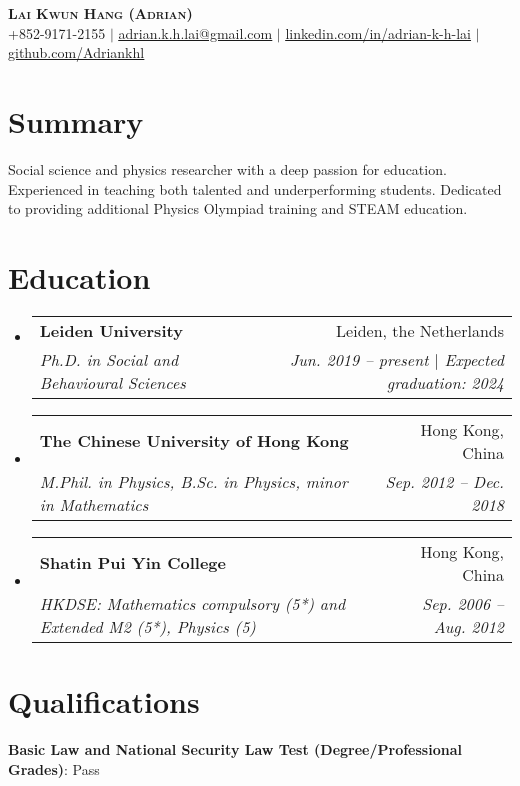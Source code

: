 \documentclass[letterpaper,11pt]{article}
\makeatletter
\newcommand{\resumeSubheading}[4]{
  \vspace{-2pt}\item
    \begin{tabular*}{0.97\textwidth}[t]{l@{\extracolsep{\fill}}r}
      \textbf{#1} & #2 \\
      \textit{\small#3} & \textit{\small #4} \\
    \end{tabular*}\vspace{-7pt}
}
\newcommand{\resumeSubHeadingListStart}{\begin{itemize}[leftmargin=0.15in, label={}]}
\newcommand{\resumeSubHeadingListEnd}{\end{itemize}}
\makeatother
\begin{document}

\begin{center}
    \textbf{\Huge \scshape Lai Kwun Hang (Adrian)} \\ \vspace{1pt}
    \small +852-9171-2155 $|$ \href{mailto:adrian.k.h.lai@gmail.com}{\underline{adrian.k.h.lai@gmail.com}} $|$ 
    \href{https://www.linkedin.com/in/adrian-k-h-lai}{\underline{linkedin.com/in/adrian-k-h-lai}} $|$
    \href{https://github.com/Adriankhl}{\underline{github.com/Adriankhl}}
\end{center}


\section{Summary}
Social science and physics researcher with a deep passion for education. 
Experienced in teaching both talented and underperforming students.
Dedicated to providing additional Physics Olympiad training and STEAM education.

\section{Education}
  \resumeSubHeadingListStart
    \resumeSubheading
      {Leiden University}{Leiden, the Netherlands}
      {Ph.D. in Social and Behavioural Sciences}{Jun. 2019 -- present $|$ Expected graduation: 2024}
    \resumeSubheading
      {The Chinese University of Hong Kong}{Hong Kong, China}
      {M.Phil. in Physics, B.Sc. in Physics, minor in Mathematics}{Sep. 2012 -- Dec. 2018}
    \resumeSubheading
      {Shatin Pui Yin College}{Hong Kong, China}
      {HKDSE: Mathematics compulsory (5*) and Extended M2 (5*), Physics (5)}{Sep. 2006 -- Aug. 2012}
  \resumeSubHeadingListEnd

\section{Qualifications}
 \begin{itemize}[leftmargin=0.15in, label={}]
    \small{\item{
     \textbf{Basic Law and National Security Law Test (Degree/Professional Grades)}{: Pass}
    }}
 \end{itemize}
\end{document}
